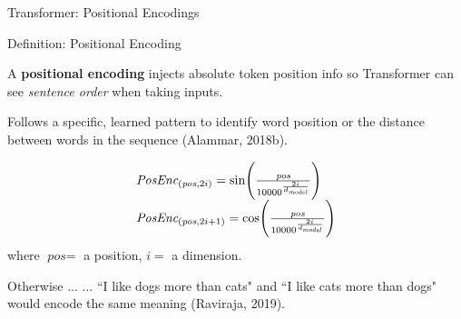 \begin{frame}{Transformer: Positional Encodings}
    
    \vspace{10pt}
    
    \begin{definitionBlock}{Definition: Positional Encoding}
        \footnotesize 
        
        A \alert{\textbf{positional encoding}} injects absolute token position info so Transformer can see \emph{sentence order} when taking inputs.\newline 
        
        Follows a specific, learned pattern to identify word position or the distance between words in the sequence (Alammar, 2018b). 
        
        $$
        \begin{array}{ll}
        \textit{PosEnc}_{\Large (\textit{pos}, 2i)} = \text{sin} \Bigg(\frac {\textit{pos}} {10000^{\Large \frac {2i} {d_{\textit{model}}} } }  \Bigg) \\
        \textit{PosEnc}_{\Large (\textit{pos}, 2i + 1)} = \text{cos} \Bigg(\frac {\textit{pos}} {10000^{\Large \frac {2i} {d_{\textit{model}}} } }  \Bigg)
        \end{array}
        $$
        where $\textit{pos} = $ a position, $i = $ a dimension.
    \end{definitionBlock}
    
    
    \vspace{-5pt}
    \begin{alertBlock}{Otherwise ...}
    ... ``I like dogs more than cats" and ``I like cats more than dogs" would encode the same meaning (Raviraja, 2019). 
    \end{alertBlock}
    
    
\end{frame}



